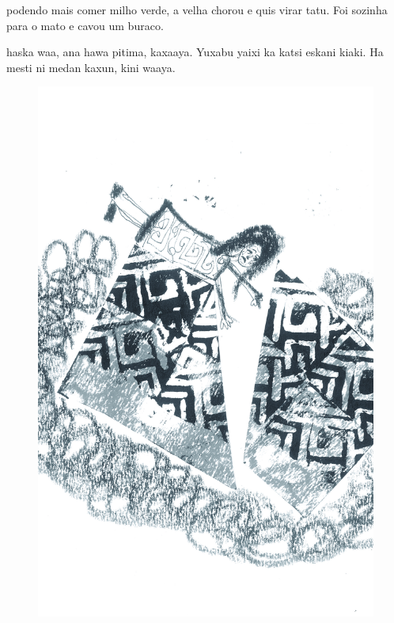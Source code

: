 
 podendo mais comer milho verde,
a velha chorou e quis virar tatu.
Foi sozinha para o mato e cavou um buraco.

\vspace{2em}

 haska waa, ana hawa pitima,
kaxaaya. Yuxabu yaixi ka katsi eskani kiaki.
Ha mesti ni medan kaxun, kini waaya.

\vspace*{\fill}

\pagebreak
\thispagestyle{empty}
\begin{figure}
\vspace*{-2cm}
\hspace*{-2.2cm}\includegraphics[width=138mm]{./imgs/img7.jpg}
\end{figure}

